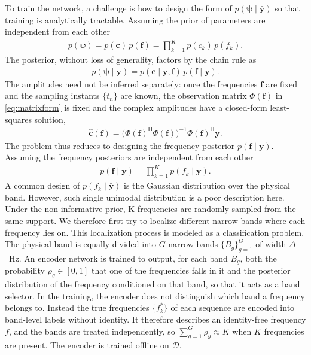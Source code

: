 \documentclass[journal,onecolumn]{IEEEtran}
\begin{document}
To train the network, a challenge is how to design the form of $p(\pmb{\psi}\mid\bar{\mathbf{y}})$ so that training is analytically tractable. Assuming the prior of parameters are independent from each other
\begin{eqnarray}
\label{eq:factor_prior}
p(\pmb{\psi})=p(\mathbf{c})\,p(\mathbf{f})=\prod_{k=1}^{K}p(c_k)\,p(f_k).
\end{eqnarray}
The posterior, without loss of generality, factors by the chain rule as
\begin{eqnarray}
\label{eq:factor_post}
p(\pmb{\psi}\mid\bar{\mathbf{y}})=p(\mathbf{c}\mid\bar{\mathbf{y}},\mathbf{f})\,p(\mathbf{f}\mid\bar{\mathbf{y}}).
\end{eqnarray}
The amplitudes need not be inferred separately: once the frequencies $\mathbf{f}$ are fixed and the sampling instants $\{t_n\}$ are known, the observation matrix $\Phi(\mathbf{f})$ in \eqref{eq:matrixform} is fixed and the complex amplitudes have a closed-form least-squares solution,
\begin{eqnarray}
\label{eq:cls}
\hat{\mathbf{c}}(\mathbf{f})=\big(\Phi(\mathbf{f})^{\mathsf H}\Phi(\mathbf{f})\big)^{-1}\Phi(\mathbf{f})^{\mathsf H}\bar{\mathbf{y}}.
\end{eqnarray}
The problem thus reduces to designing the frequency posterior $p(\mathbf{f}\mid\bar{\mathbf{y}})$. Assuming the frequency posteriors are independent from each other
\begin{eqnarray}
\label{eq:factor_freq_post}
p(\mathbf{f}\mid\bar{\mathbf{y}})=\prod_{k=1}^{K}p(f_k\mid\bar{\mathbf{y}}).
\end{eqnarray}
A common design of $p(f_k\mid\bar{\mathbf{y}})$ is the Gaussian distribution over the physical band. However, such single unimodal distribution is a poor description here. Under the non-informative prior, K frequencies are randomly sampled from the same support.
We therefore first try to localize different narrow bands where each frequency lies on. This localization process is modeled as a classification problem. The physical band is equally divided into $G$ narrow bands $\{B_g\}_{g=1}^{G}$ of width $\Delta$~Hz. An encoder network is trained to output, for each band $B_g$, both the probability $\rho_g\in[0,1]$ that one of the frequencies falls in it and the posterior distribution of the frequency conditioned on that band, so that it acts as a band selector.
In the training, the encoder does not distinguish which band a frequency belongs to. Instead the true frequencies $\{f_k^\ast\}$ of each sequence are encoded into band-level labels without identity. It therefore describes an identity-free frequency $f$, and the bands are treated independently, so $\sum_{g=1}^{G}\rho_g\approx K$ when $K$ frequencies are present. The encoder is trained offline on $\mathcal{D}$.
\end{document}
